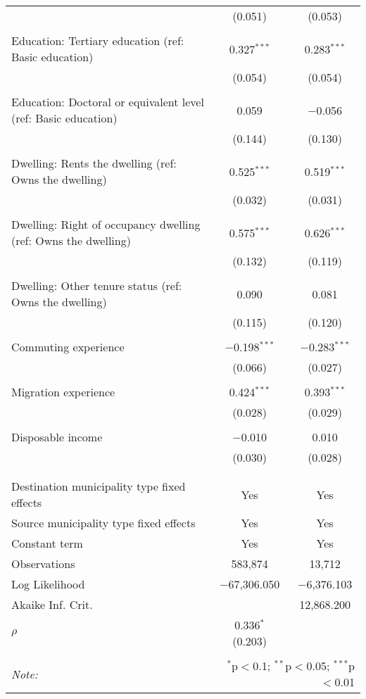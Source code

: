 \begin{table}[!htbp]
\begin{tabular}{@{\extracolsep{5pt}}lcc}
  & (0.051) & (0.053) \\ 
  & & \\ 
 Education: Tertiary education (ref: Basic education) & 0.327$^{***}$ & 0.283$^{***}$ \\ 
  & (0.054) & (0.054) \\ 
  & & \\ 
 Education: Doctoral or equivalent level (ref: Basic education) & 0.059 & $-$0.056 \\ 
  & (0.144) & (0.130) \\ 
  & & \\ 
 Dwelling: Rents the dwelling (ref: Owns the dwelling) & 0.525$^{***}$ & 0.519$^{***}$ \\ 
  & (0.032) & (0.031) \\ 
  & & \\ 
 Dwelling: Right of occupancy dwelling (ref: Owns the dwelling) & 0.575$^{***}$ & 0.626$^{***}$ \\ 
  & (0.132) & (0.119) \\ 
  & & \\ 
 Dwelling: Other tenure status (ref: Owns the dwelling) & 0.090 & 0.081 \\ 
  & (0.115) & (0.120) \\ 
  & & \\ 
 Commuting experience & $-$0.198$^{***}$ & $-$0.283$^{***}$ \\ 
  & (0.066) & (0.027) \\ 
  & & \\ 
 Migration experience & 0.424$^{***}$ & 0.393$^{***}$ \\ 
  & (0.028) & (0.029) \\ 
  & & \\ 
 Disposable income & $-$0.010 & 0.010 \\ 
  & (0.030) & (0.028) \\ 
  & & \\ 
\hline \\[-1.8ex] 
Destination municipality type fixed effects & Yes & Yes \\ 
Source municipality type fixed effects & Yes & Yes \\ 
Constant term & Yes & Yes \\ 
Observations & 583,874 & 13,712 \\ 
Log Likelihood & $-$67,306.050 & $-$6,376.103 \\ 
Akaike Inf. Crit. &  & 12,868.200 \\ 
$\rho$ & 0.336$^{*}$  (0.203) &  \\ 
\hline 
\hline \\[-1.8ex] 
\textit{Note:}  & \multicolumn{2}{r}{$^{*}$p$<$0.1; $^{**}$p$<$0.05; $^{***}$p$<$0.01} \\ 
\end{tabular} 
\end{table} 
